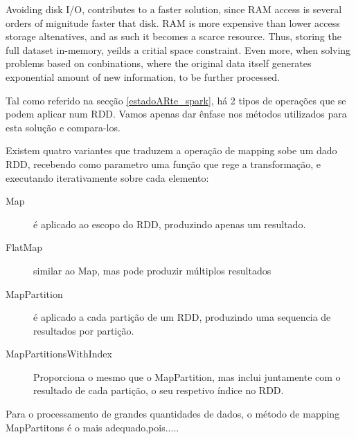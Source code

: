 Avoiding disk I/O, contributes to a faster solution, since RAM access is several orders of mignitude faster that disk. RAM is more expensive than lower access storage altenatives, and as such it becomes a scarce resource. Thus, storing the full dataset in-memory, yeilds a critial space constraint. Even more, when solving problems based on conbinations, where the original data itself generates exponential amount of new information, to be further processed.


Tal como referido na secção \ref{estadoARte_spark}, há 2 tipos de operações que se podem aplicar num RDD. Vamos apenas dar ênfase nos métodos utilizados para esta solução e compara-los. 


Existem quatro variantes que traduzem a operação de mapping sobe um dado RDD, recebendo como parametro uma função que rege a transformação, e executando iterativamente sobre cada elemento:
\begin{description}
    \item [Map] é aplicado ao escopo do RDD, produzindo apenas um resultado.
    \item [FlatMap] similar ao Map, mas pode produzir múltiplos resultados
    \item [MapPartition] é aplicado a cada partição de um RDD, produzindo uma sequencia de resultados por partição.
    \item [MapPartitionsWithIndex] Proporciona o mesmo que o MapPartition, mas inclui juntamente com o resultado de cada partição, o seu respetivo índice no RDD. 
\end{description}
%

Para o processamento de grandes quantidades de dados, o método de mapping MapPartitons é o mais adequado,pois.....

